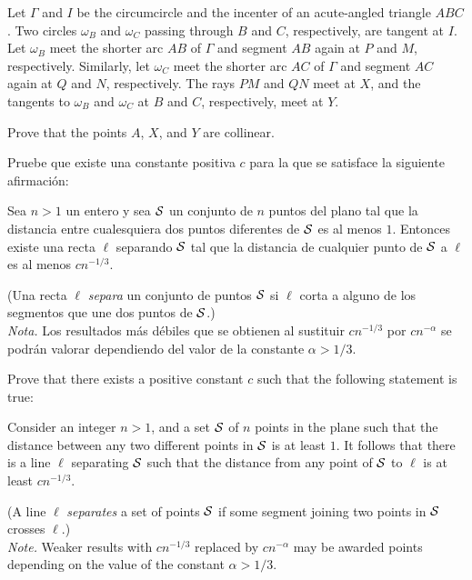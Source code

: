\begin{probHG}[ISL 2020/G8]
  Let $\Gamma$ and $I$ be the circumcircle and the incenter of an acute-angled
  triangle $ABC$. Two circles $\omega_B$ and $\omega_C$ passing through $B$ and
  $C$, respectively, are tangent at $I$. Let $\omega_B$ meet the shorter arc
  $AB$ of $\Gamma$ and segment $AB$ again at $P$ and $M$, respectively.
  Similarly, let $\omega_C$ meet the shorter arc $AC$ of $\Gamma$ and segment
  $AC$ again at $Q$ and $N$, respectively. The rays $PM$ and $QN$ meet at $X$,
  and the tangents to $\omega_B$ and $\omega_C$ at $B$ and $C$, respectively,
  meet at $Y$.

  Prove that the points $A$, $X$, and $Y$ are collinear.
\end{probHG}

\begin{probHB}
  Pruebe que existe una constante positiva $c$ para la que se satisface la
  siguiente afirmación:

  Sea $n>1$ un entero y sea $\cal S$ un conjunto de $n$ puntos del plano tal que
  la distancia entre cualesquiera dos puntos diferentes de $\cal S$ es al menos
  $1$. Entonces existe una recta $\ell$ separando $\cal S$ tal que la distancia
  de cualquier punto de $\cal S$ a $\ell$ es al menos $cn^{-1/3}$.

  (Una recta $\ell$ \emph{separa} un conjunto de puntos $\cal S$ si $\ell$ corta
  a alguno de los segmentos que une dos puntos de $\cal S$.) \\[4pt]
  \emph{Nota.} Los resultados más débiles que se obtienen al sustituir
  $cn^{-1/3}$ por $cn^{-\alpha}$ se podrán valorar dependiendo del valor de la
  constante $\alpha>1/3$.
  \begin{hint}
    Prove that there exists a positive constant $c$ such that the following
    statement is true:

    Consider an integer $n>1$, and a set $\cal S$ of $n$ points in the plane
    such that the distance between any two different points in $\cal S$ is at
    least $1$. It follows that there is a line $\ell$ separating $\cal S$ such
    that the distance from any point of $\cal S$ to $\ell$ is at least
    $cn^{-1/3}$.

    (A line $\ell$ \emph{separates} a set of points $\cal S$ if some segment
    joining two points in $\cal S$ crosses $\ell$.) \\[4pt]
    \emph{Note.} Weaker results with $cn^{-1/3}$ replaced by $cn^{-\alpha}$ may
    be awarded points depending on the value of the constant $\alpha>1/3$.
  \end{hint}
\end{probHB}

